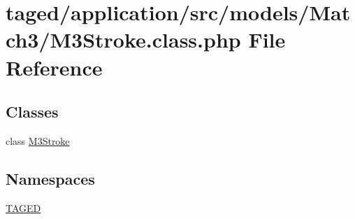 \hypertarget{_m3_stroke_8class_8php}{}\section{taged/application/src/models/\+Match3/\+M3\+Stroke.class.\+php File Reference}
\label{_m3_stroke_8class_8php}
\subsection*{Classes}
\begin{DoxyCompactItemize}
\item 
class \hyperlink{class_m3_stroke}{M3\+Stroke}
\end{DoxyCompactItemize}
\subsection*{Namespaces}
\begin{DoxyCompactItemize}
\item 
 \hyperlink{namespace_t_a_g_e_d}{T\+A\+G\+ED}
\end{DoxyCompactItemize}
